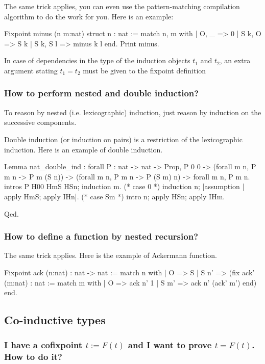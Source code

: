 \documentclass[a4paper,pdftex]{article}
\def\Question#1{\stepcounter{question}\subsubsection{#1}}
\begin{document}
 The same trick applies, you can even use the pattern-matching
compilation algorithm to do the work for you. Here is an example:

\begin{coq_example}
Fixpoint minus (n m:nat) {struct n} : nat :=
  match n, m with
  | O, _ => 0
  | S k, O => S k
  | S k, S l => minus k l
  end.
Print  minus.
\end{coq_example}

In case of dependencies in the type of the induction objects
$t_1$ and $t_2$, an extra argument stating $t_1=t_2$ must be given to
the fixpoint definition

\Question{How to perform nested and double induction?}

 To reason by nested (i.e. lexicographic) induction, just reason by
induction on the successive components.

\smallskip

Double induction (or induction on pairs) is a restriction of the
lexicographic induction. Here is an example of double induction.

\begin{coq_example}
Lemma nat_double_ind :
forall P : nat -> nat -> Prop, P 0 0 ->
  (forall m n, P m n -> P m (S n)) ->
  (forall m n, P m n -> P (S m) n) ->
     forall m n, P m n.
intros P H00 HmS HSn; induction m.
(* case 0 *)
induction n; [assumption | apply HmS; apply IHn].
(* case Sm *)
intro n; apply HSn; apply IHm.
\end{coq_example}
\begin{coq_example*}
Qed.
\end{coq_example*}

\Question{How to define a function by nested recursion?}

 The same trick applies. Here is the example of Ackermann
function.

\begin{coq_example}
Fixpoint ack (n:nat) : nat -> nat :=
  match n with
  | O => S
  | S n' =>
     (fix ack' (m:nat) : nat :=
        match m with
        | O => ack n' 1
        | S m' => ack n' (ack' m')
        end)
  end.
\end{coq_example}


\subsection{Co-inductive types}

\Question{I have a cofixpoint $t:=F(t)$ and I want to prove $t=F(t)$. How to do it?}
\end{document}
